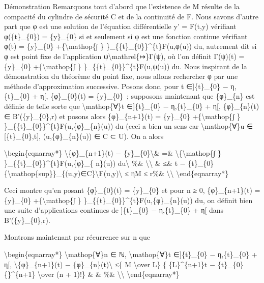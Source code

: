 \documentclass[]{article}
\begin{document}
Démonstration Remarquons tout d'abord que l'existence de M résulte de la
compacité du cylindre de sécurité C et de la continuité de F. Nous
savons d'autre part que φ est une solution de l'équation différentielle
y' = F(t,y) vérifiant φ(\{t\}\_\{0\}) = \{y\}\_\{0\} si et seulement si
φ est une fonction continue vérifiant φ(t) = \{y\}\_\{0\}
+\{\textbackslash{}mathop\{∫ \} \}\_\{\{t\}\_\{0\}\}\^{}\{t\}F(u,φ(u))
du, autrement dit si φ est point fixe de l'application
ψ\textbackslash{}mathrel\{↦\}Γ(ψ), où l'on définit Γ(ψ)(t) =
\{y\}\_\{0\} +\{\textbackslash{}mathop\{∫ \}
\}\_\{\{t\}\_\{0\}\}\^{}\{t\}F(u,ψ(u)) du. Nous inspirant de la
démonstration du théorème du point fixe, nous allons rechercher φ par
une méthode d'approximation successive. Posons donc, pour t
∈{]}\{t\}\_\{0\} − η,\{t\}\_\{0\} + η{[}, \{φ\}\_\{0\}(t) =
\{y\}\_\{0\}~; supposons maintenant que \{φ\}\_\{n\} est définie de
telle sorte que \textbackslash{}mathop\{∀\}t ∈{]}\{t\}\_\{0\} −
η,\{t\}\_\{0\} + η{[}, \{φ\}\_\{n\}(t) ∈ B'(\{y\}\_\{0\},r) et posons
alors \{φ\}\_\{n+1\}(t) = \{y\}\_\{0\} +\{\textbackslash{}mathop\{∫ \}
\}\_\{\{t\}\_\{0\}\}\^{}\{t\}F(u,\{φ\}\_\{n\}(u)) du (ceci a bien un
sens car \textbackslash{}mathop\{∀\}u ∈ {[}\{t\}\_\{0\},t{]},
(u,\{φ\}\_\{n\}(u)) ∈ C ⊂ U). On a alors

\textbackslash{}begin\{eqnarray*\}
\textbackslash{}\textbar{}\{φ\}\_\{n+1\}(t) −
\{y\}\_\{0\}\textbackslash{}\textbar{}\& =\&
\textbackslash{}\textbar{}\{\textbackslash{}mathop\{∫ \}
\}\_\{\{t\}\_\{0\}\}\^{}\{t\}F(u,\{φ\}\_\{ n\}(u))
du\textbackslash{}\textbar{} \%\& \textbackslash{}\textbackslash{} \&
≤\& \textbar{}t −
\{t\}\_\{0\}\textbar{}\{\textbackslash{}mathop\{sup\}\}\_\{(u,y)∈C\}\textbackslash{}\textbar{}F(u,y)\textbackslash{}\textbar{}
≤ ηM ≤ r\%\& \textbackslash{}\textbackslash{}
\textbackslash{}end\{eqnarray*\}

Ceci montre qu'en posant \{φ\}\_\{0\}(t) = \{y\}\_\{0\} et pour n ≥ 0,
\{φ\}\_\{n+1\}(t) = \{y\}\_\{0\} +\{\textbackslash{}mathop\{∫ \}
\}\_\{\{t\}\_\{0\}\}\^{}\{t\}F(u,\{φ\}\_\{n\}(u)) du, on définit bien
une suite d'applications continues de {]}\{t\}\_\{0\} − η,\{t\}\_\{0\} +
η{[} dans B'(\{y\}\_\{0\},r).

Montrons maintenant par récurrence sur n que

\textbackslash{}begin\{eqnarray*\} \textbackslash{}mathop\{∀\}n ∈ ℕ,
\textbackslash{}mathop\{∀\}t ∈{]}\{t\}\_\{0\} − η,\{t\}\_\{0\} + η{[},
\textbackslash{}\textbar{}\{φ\}\_\{n+1\}(t) −
\{φ\}\_\{n\}(t)\textbackslash{}\textbar{} ≤\{ M \textbackslash{}over L\}
\{ \{L\}\^{}\{n+1\}\textbar{}t − \{t\}\_\{0\}\{\textbar{}\}\^{}\{n+1\}
\textbackslash{}over (n + 1)!\} \& \& \%\&
\textbackslash{}\textbackslash{} \textbackslash{}end\{eqnarray*\}
\end{document}
